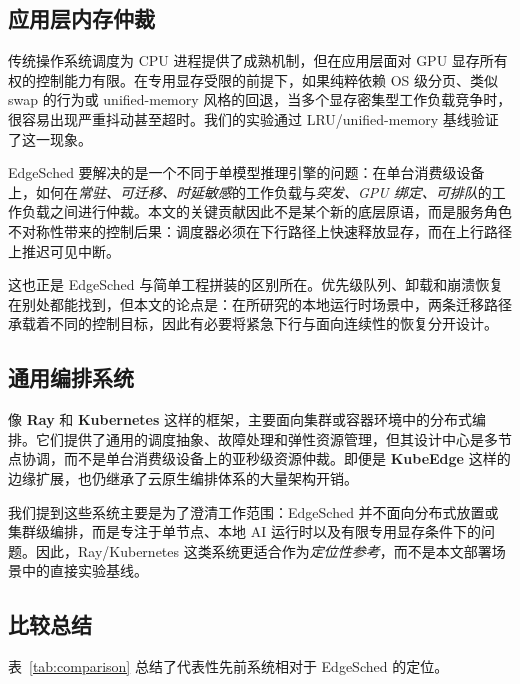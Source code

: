 \subsection{应用层内存仲裁}

传统操作系统调度为 CPU 进程提供了成熟机制，但在应用层面对 GPU 显存所有权的控制能力有限。在专用显存受限的前提下，如果纯粹依赖 OS 级分页、类似 swap 的行为或 unified-memory 风格的回退，当多个显存密集型工作负载竞争时，很容易出现严重抖动甚至超时。我们的实验通过 LRU/unified-memory 基线验证了这一现象。

EdgeSched 要解决的是一个不同于单模型推理引擎的问题：在单台消费级设备上，如何在\emph{常驻、可迁移、时延敏感}的工作负载与\emph{突发、GPU 绑定、可排队}的工作负载之间进行仲裁。本文的关键贡献因此不是某个新的底层原语，而是服务角色不对称性带来的控制后果：调度器必须在下行路径上快速释放显存，而在上行路径上推迟可见中断。

这也正是 EdgeSched 与简单工程拼装的区别所在。优先级队列、卸载和崩溃恢复在别处都能找到，但本文的论点是：在所研究的本地运行时场景中，两条迁移路径承载着不同的控制目标，因此有必要将紧急下行与面向连续性的恢复分开设计。

\subsection{通用编排系统}

像 \textbf{Ray}\cite{moritz2018ray} 和 \textbf{Kubernetes}\cite{verma2015borg} 这样的框架，主要面向集群或容器环境中的分布式编排。它们提供了通用的调度抽象、故障处理和弹性资源管理，但其设计中心是多节点协调，而不是单台消费级设备上的亚秒级资源仲裁。即便是 \textbf{KubeEdge}\cite{xiong2019kubeedge} 这样的边缘扩展，也仍继承了云原生编排体系的大量架构开销。

我们提到这些系统主要是为了澄清工作范围：EdgeSched 并不面向分布式放置或集群级编排，而是专注于单节点、本地 AI 运行时以及有限专用显存条件下的问题。因此，Ray/Kubernetes 这类系统更适合作为\emph{定位性参考}，而不是本文部署场景中的直接实验基线。

\subsection{比较总结}

表~\ref{tab:comparison} 总结了代表性先前系统相对于 EdgeSched 的定位。

